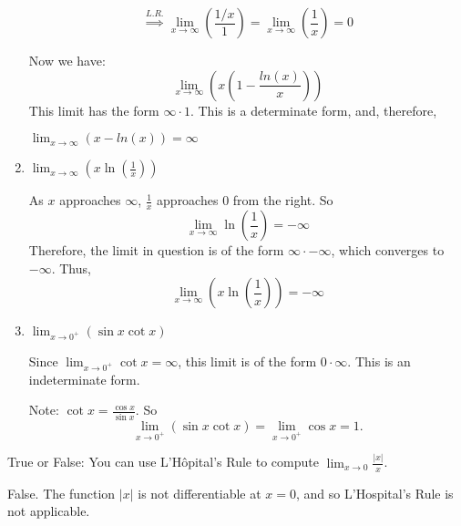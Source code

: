 \documentclass[nooutcomes]{ximera}
\begin{document}
\begin{problem}
\begin{enumerate}
\begin{freeResponse}
      $$\stackrel{L.R.}{\implies} \lim_{x \to \infty}\left(\frac{1/x}{1}\right)=\lim_{x \to \infty}\left(\frac{1}{x}\right)=0$$
      
      Now we have: 
      $$\lim_{x \to \infty} \left(x\left(1-\frac{ln(x)}{x}\right)\right)$$
      This limit has the form $\infty \cdot 1$.  This is a determinate form, and, therefore,

	 $\lim_{x \to \infty} (x-ln(x)) =\infty$
   
    \end{freeResponse}

  \item  $\lim_{x \to \infty} \left( x \ln \left( \frac{1}{x} \right) \right) $
    \begin{freeResponse}
      As $x$ approaches $\infty$, $\frac{1}{x}$ approaches $0$ from the right.
      So  $$\lim_{x \to \infty} \ln \left( \frac{1}{x} \right) = - \infty $$
      Therefore, the limit in question is of the form $\infty \cdot - \infty$, which converges to $- \infty$.
      Thus, 
      $$ \lim_{x \to \infty} \left( x \ln \left( \frac{1}{x} \right) \right) = - \infty $$
    \end{freeResponse}

  \item  $\lim_{x \to 0^+} (\sin x \cot x ) $
    \begin{freeResponse}
      Since $\lim_{x \to 0^+} \cot x = \infty$, this limit is of the form $0 \cdot \infty$.
      This is an indeterminate form.
      
     Note: $\cot x = \frac{\cos x }{\sin x}$.  So
      $$\lim_{x \to 0^+} (\sin x \cot x ) = \lim_{x \to 0^+} \cos x = 1 .$$
    \end{freeResponse}
  \end{enumerate}
\end{problem}


\begin{problem}

  True or False: You can use L'H\^{o}pital's Rule to compute
  $\lim_{x \to 0} \frac{|x|}{x}$.
  \begin{freeResponse}
    False.
    The function $|x|$ is not differentiable at $x=0$, and so L'Hospital's Rule is not applicable.
  \end{freeResponse}
\end{problem}
\end{document}
